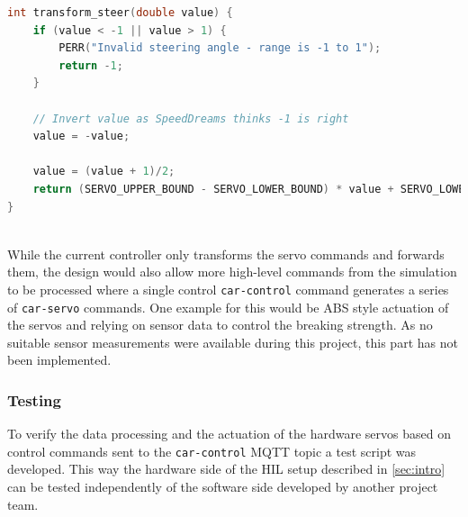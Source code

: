 \begin{minipage}{\linewidth}
\begin{lstlisting}[style=mylistings, language=c, label=lst:panda-tsteer, caption=Algorithm for  calculating the steering servo commands]
int transform_steer(double value) {
	if (value < -1 || value > 1) {
		PERR("Invalid steering angle - range is -1 to 1");
		return -1;
	}

	// Invert value as SpeedDreams thinks -1 is right
	value = -value;

	value = (value + 1)/2;
	return (SERVO_UPPER_BOUND - SERVO_LOWER_BOUND) * value + SERVO_LOWER_BOUND;
}
\end{lstlisting}
\end{minipage} \\

%


While the current controller only transforms the servo commands and forwards them, the design would also allow more high-level commands from the simulation to be processed where a single control \texttt{car-control} command generates a series of \texttt{car-servo} commands.
One example for this would be ABS style actuation of the servos and relying on sensor data to control the breaking strength.
As no suitable sensor measurements were available during this project, this part has not been implemented.

\subsubsection{Testing}
\label{sec:panda-testing}
To verify the data processing and the actuation of the hardware servos based on control commands sent to the \texttt{car-control} MQTT topic a test script was developed.
This way the hardware side of the HIL setup described in \autoref{sec:intro} can be tested independently of the software side developed by another project team.


